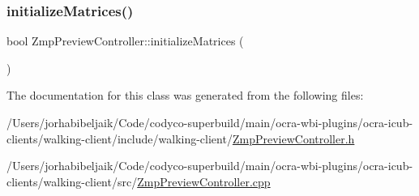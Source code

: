 \subsubsection{\texorpdfstring{initialize\+Matrices()}{initializeMatrices()}}
{\footnotesize\ttfamily bool Zmp\+Preview\+Controller\+::initialize\+Matrices (\begin{DoxyParamCaption}{ }\end{DoxyParamCaption})}



The documentation for this class was generated from the following files\+:\begin{DoxyCompactItemize}
\item 
/\+Users/jorhabibeljaik/\+Code/codyco-\/superbuild/main/ocra-\/wbi-\/plugins/ocra-\/icub-\/clients/walking-\/client/include/walking-\/client/\hyperlink{ZmpPreviewController_8h}{Zmp\+Preview\+Controller.\+h}\item 
/\+Users/jorhabibeljaik/\+Code/codyco-\/superbuild/main/ocra-\/wbi-\/plugins/ocra-\/icub-\/clients/walking-\/client/src/\hyperlink{ZmpPreviewController_8cpp}{Zmp\+Preview\+Controller.\+cpp}\end{DoxyCompactItemize}
